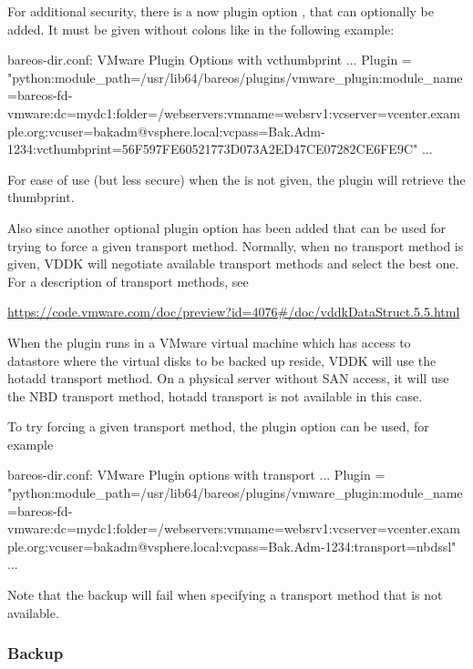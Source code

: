 For additional security, there is a now plugin option , that can optionally
be added. It must be given without colons like in the following example:

\begin{bconfig}{bareos-dir.conf: VMware Plugin Options with vcthumbprint}
    ...
    Plugin = "python:module_path=/usr/lib64/bareos/plugins/vmware_plugin:module_name=bareos-fd-vmware:dc=mydc1:folder=/webservers:vmname=websrv1:vcserver=vcenter.example.org:vcuser=bakadm@vsphere.local:vcpass=Bak.Adm-1234:vcthumbprint=56F597FE60521773D073A2ED47CE07282CE6FE9C"
    ...
\end{bconfig}

For ease of use (but less secure) when the  is not given, the plugin
will retrieve the thumbprint.

Also since  another optional plugin option has
been added that can be used for trying to force a given transport method. Normally, when
no transport method is given, VDDK will negotiate available transport methods and select
the best one. For a description of transport methods, see

\url{https://code.vmware.com/doc/preview?id=4076#/doc/vddkDataStruct.5.5.html}

When the plugin runs in a VMware virtual machine which has access to datastore where the
virtual disks to be backed up reside, VDDK will use the hotadd transport method.
On a physical server without SAN access, it will use the NBD transport method, hotadd
transport is not available in this case.

To try forcing a given transport method, the plugin option  can
be used, for example

\begin{bconfig}{bareos-dir.conf: VMware Plugin options with transport}
    ...
    Plugin = "python:module_path=/usr/lib64/bareos/plugins/vmware_plugin:module_name=bareos-fd-vmware:dc=mydc1:folder=/webservers:vmname=websrv1:vcserver=vcenter.example.org:vcuser=bakadm@vsphere.local:vcpass=Bak.Adm-1234:transport=nbdssl"
    ...
\end{bconfig}

Note that the backup will fail when specifying a transport method that is not available.

\subsubsection{Backup}


